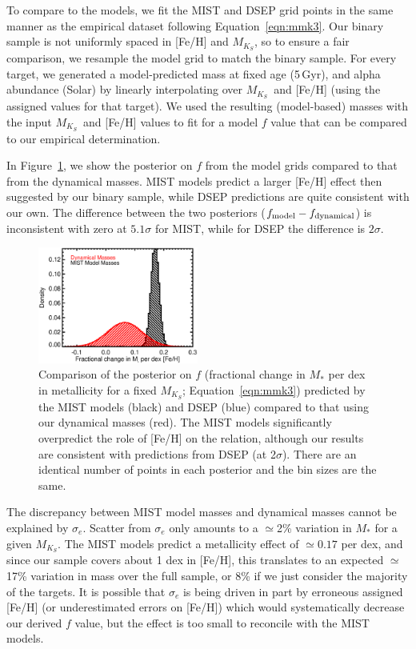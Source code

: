 \documentclass[twocolumn]{aastex62}
\newcommand{\mks}{$M_{K_S}$}
\begin{document}
To compare to the models, we fit the MIST and DSEP grid points in the same manner as the empirical dataset following Equation~\ref{eqn:mmk3}. Our binary sample is not uniformly spaced in [Fe/H] and \mks, so to ensure a fair comparison, we resample the model grid to match the binary sample. For every target, we generated a model-predicted mass at fixed age (5\,Gyr), and alpha abundance (Solar) by linearly interpolating over \mks\ and [Fe/H] (using the assigned values for that target). We used the resulting (model-based) masses with the input \mks\ and [Fe/H] values to fit for a model $f$ value that can be compared to our empirical determination.

In Figure~\ref{fig:f}, we show the posterior on $f$ from the model grids compared to that from the dynamical masses. MIST models predict a larger [Fe/H] effect then suggested by our binary sample, while DSEP predictions are quite consistent with our own. The difference between the two posteriors ($f_{\rm{model}}-f_{\rm{dynamical}}$) is inconsistent with zero at $5.1\sigma$ for MIST, while for DSEP the difference is $2\sigma$. 

\begin{figure}[htp]
\begin{center}
\includegraphics[width=0.47\textwidth]{F_plot.eps}
\caption{Comparison of the posterior on $f$ (fractional change in $M_*$ per dex in metallicity for a fixed \mks; Equation~\ref{eqn:mmk3}) predicted by the MIST models (black) and DSEP (blue) compared to that using our dynamical masses (red). The MIST models significantly overpredict the role of [Fe/H] on the relation, although our results are consistent with predictions from DSEP (at 2$\sigma$). There are an identical number of points in each posterior and the bin sizes are the same. }
\label{fig:f}
\end{center}
\end{figure}

The discrepancy between MIST model masses and dynamical masses cannot be explained by $\sigma_e$. Scatter from $\sigma_e$ only amounts to a $\simeq$2\% variation in $M_*$ for a given \mks. The MIST models predict a metallicity effect of $\simeq0.17$ per dex, and since our sample covers about 1 dex in [Fe/H], this translates to an expected $\simeq$17\% variation in mass over the full sample, or 8\% if we just consider the majority of the targets. It is possible that $\sigma_e$ is being driven in part by erroneous assigned [Fe/H] (or underestimated errors on [Fe/H]) which would systematically decrease our derived $f$ value, but the effect is too small to reconcile with the MIST models. 
\end{document}
